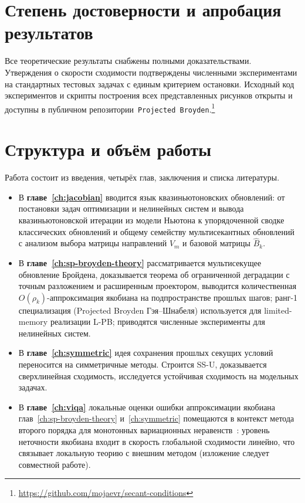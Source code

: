 \section*{Степень достоверности и апробация результатов}

Все теоретические результаты снабжены полными доказательствами.
Утверждения о скорости сходимости подтверждены численными экспериментами
на стандартных тестовых задачах с единым критерием остановки.
Исходный код экспериментов и скрипты построения всех представленных
рисунков открыты и доступны в публичном
репозитории~\texttt{Projected Broyden}.\footnote{\url{https://github.com/mojaevr/secant-conditions}}

\section*{Структура и объём работы}

Работа состоит из введения, четырёх глав, заключения и списка литературы.

\begin{itemize}[leftmargin=*]
  \item В \textbf{главе~\ref{ch:jacobian}} вводится язык
        квазиньютоновских обновлений: от постановки задач оптимизации и
        нелинейных систем и вывода квазиньютоновской итерации из модели
        Ньютона к упорядоченной сводке классических обновлений и общему
        семейству мультисекантных обновлений с анализом выбора матрицы
        направлений $V_m$ и базовой матрицы $\widehat{B}_k$.
  \item В \textbf{главе~\ref{ch:sp-broyden-theory}} рассматривается
        мультисекущее обновление Бройдена,
        доказывается теорема об ограниченной деградации с точным
        разложением и расширенным проектором, выводится количественная
        $O(\rho_k)$-аппроксимация якобиана на подпространстве прошлых
        шагов; ранг-1 специализация (Projected Broyden Гэя--Шнабеля)
        используется для limited-memory реализации L-PB; приводятся
        численные эксперименты для нелинейных систем.
  \item В \textbf{главе~\ref{ch:symmetric}} идея сохранения прошлых секущих условий
        переносится на симметричные методы. Строится SS-U,
        доказывается сверхлинейная сходимость, исследуется
        устойчивая сходимость на модельных задачах.
  \item В \textbf{главе~\ref{ch:viqa}} локальные оценки ошибки
        аппроксимации якобиана глав~\ref{ch:sp-broyden-theory}
        и~\ref{ch:symmetric} помещаются в контекст метода второго
        порядка для монотонных вариационных
        неравенств~\cite{viqa2024}: уровень неточности якобиана входит
        в скорость глобальной сходимости линейно, что связывает
        локальную теорию с внешним методом (изложение следует
        совместной работе).
\end{itemize}
